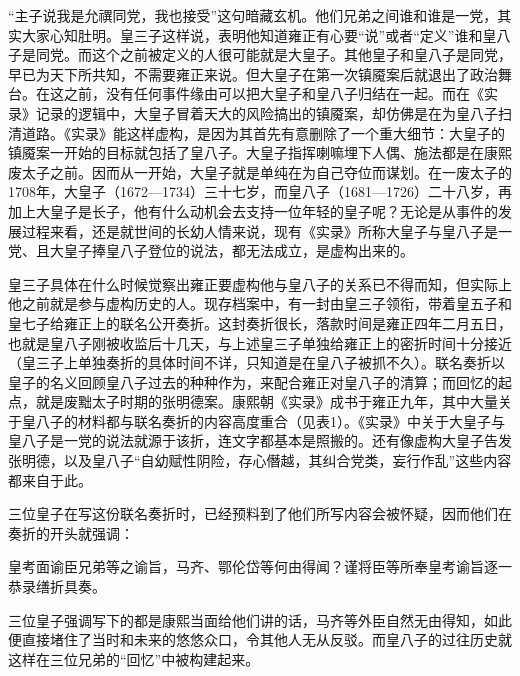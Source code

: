 
“主子说我是允禩同党，我也接受”这句暗藏玄机。他们兄弟之间谁和谁是一党，其实大家心知肚明。皇三子这样说，表明他知道雍正有心要“说”或者“定义”谁和皇八子是同党。而这个之前被定义的人很可能就是大皇子。其他皇子和皇八子是同党，早已为天下所共知，不需要雍正来说。但大皇子在第一次镇魇案后就退出了政治舞台。在这之前，没有任何事件缘由可以把大皇子和皇八子归结在一起。而在《实录》记录的逻辑中，大皇子冒着天大的风险搞出的镇魇案，却仿佛是在为皇八子扫清道路。《实录》能这样虚构，是因为其首先有意删除了一个重大细节：大皇子的镇魇案一开始的目标就包括了皇八子。大皇子指挥喇嘛埋下人偶、施法都是在康熙废太子之前。因而从一开始，大皇子就是单纯在为自己夺位而谋划。在一废太子的1708年，大皇子（1672—1734）三十七岁，而皇八子（1681—1726）二十八岁，再加上大皇子是长子，他有什么动机会去支持一位年轻的皇子呢？无论是从事件的发展过程来看，还是就世间的长幼人情来说，现有《实录》所称大皇子与皇八子是一党、且大皇子捧皇八子登位的说法，都无法成立，是虚构出来的。



皇三子具体在什么时候觉察出雍正要虚构他与皇八子的关系已不得而知，但实际上他之前就是参与虚构历史的人。现存档案中，有一封由皇三子领衔，带着皇五子和皇七子给雍正上的联名公开奏折。这封奏折很长，落款时间是雍正四年二月五日，也就是皇八子刚被收监后十几天，与上述皇三子单独给雍正上的密折时间十分接近（皇三子上单独奏折的具体时间不详，只知道是在皇八子被抓不久）。联名奏折以皇子的名义回顾皇八子过去的种种作为，来配合雍正对皇八子的清算；而回忆的起点，就是废黜太子时期的张明德案。康熙朝《实录》成书于雍正九年，其中大量关于皇八子的材料都与联名奏折的内容高度重合（见表1）。《实录》中关于大皇子与皇八子是一党的说法就源于该折，连文字都基本是照搬的。还有像虚构大皇子告发张明德，以及皇八子“自幼赋性阴险，存心僭越，其纠合党类，妄行作乱”这些内容都来自于此。



三位皇子在写这份联名奏折时，已经预料到了他们所写内容会被怀疑，因而他们在奏折的开头就强调：



\begin{bookquote}皇考面谕臣兄弟等之谕旨，马齐、鄂伦岱等何由得闻？谨将臣等所奉皇考谕旨逐一恭录缮折具奏。\end{bookquote}


三位皇子强调写下的都是康熙当面给他们讲的话，马齐等外臣自然无由得知，如此便直接堵住了当时和未来的悠悠众口，令其他人无从反驳。而皇八子的过往历史就这样在三位兄弟的“回忆”中被构建起来。


